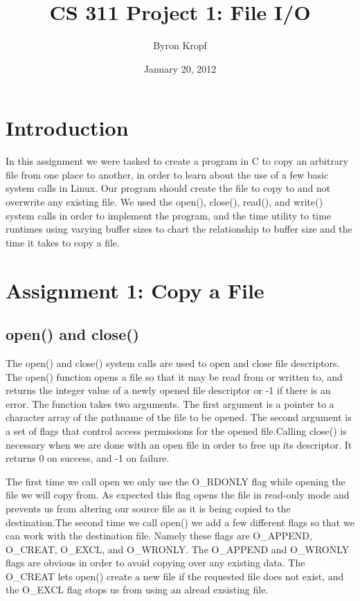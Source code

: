 \documentclass[letterpaper,10pt,twocolumn,titlepage]{article}
\title{CS 311 Project 1: File I/O}
\date{January 20, 2012}
\author{Byron Kropf}
\begin{document}
\section{Introduction}
In this assignment we were tasked to create a program in C to copy an arbitrary file from one place to another, in order to learn about the use of a few basic system calls in Linux. Our program should create the file to copy to and not overwrite any existing file. We used the open(), close(), read(), and write() system calls in order to implement the program, and the time utility to time runtimes using varying buffer sizes to chart the relationship to buffer size and the time it takes to copy a file.

\section{Assignment 1: Copy a File}
\subsection{open() and close()}
The open() and close() system calls are used to open and close file descriptors. The open() function opens a file so that it may be read from or written to, and returns the integer value of a newly opened file descriptor or -1 if there is an error. The function takes two arguments. The first argument is a pointer to a character array of the pathname of the file to be opened. The second argument is a set of flags that control access permissions for the opened file.Calling close() is necessary when we are done with an open file in order to free up its descriptor. It returns 0 on success, and -1 on failure.

\newLine
\newLine

The first time we call open we only use the O\_RDONLY flag while opening the file we will copy from. As expected this flag opens the file in read-only mode and prevents us from altering our source file as it is being copied to the destination.The second time we call open() we add a few different flags so that we can work with the destination file. Namely these flags are O\_APPEND, O\_CREAT, O\_EXCL, and O\_WRONLY. The O\_APPEND and O\_WRONLY flags are obvious in order to avoid copying over any existing data. The O\_CREAT lets open() create a new file if the requested file does not exist, and the O\_EXCL flag stops us from using an alread exsisting file.

\newline
\newline
\end{document}
